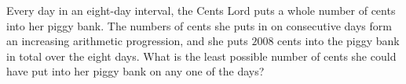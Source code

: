 Every day in an eight-day interval, the Cents Lord puts a whole number of cents into her piggy bank. The numbers of cents she puts in on consecutive days form an increasing arithmetic progression, and she puts $2008$ cents into the piggy bank in total over the eight days. What is the least possible number of cents she could have put into her piggy bank on any one of the days?
